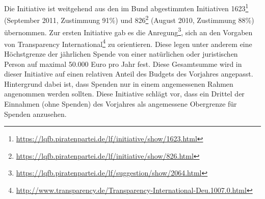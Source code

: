 Die Initiative ist weitgehend aus den im Bund abgestimmten Initiativen 1623\footnote{\url{https://lqfb.piratenpartei.de/lf/initiative/show/1623.html}} (September 2011, Zustimmung 91\%) und 826\footnote{\url{https://lqfb.piratenpartei.de/lf/initiative/show/826.html}} (August 2010, Zustimmung 88\%) übernommen. Zur ersten Initiative gab es die Anregung\footnote{\url{https://lqfb.piratenpartei.de/lf/suggestion/show/2064.html}}, sich an den Vorgaben von Transparency International\footnote{\url{http://www.transparency.de/Transparency-International-Deu.1007.0.html}} zu orientieren. Diese legen unter anderem eine Höchstgrenze der jährlichen Spende von einer natürlichen oder juristischen Person auf maximal 50.000 Euro pro Jahr fest. Diese Gesamtsumme wird in dieser Initiative auf einen relativen Anteil des Budgets des Vorjahres angepasst. Hintergrund dabei ist, dass Spenden nur in einem angemessenen Rahmen angenommen werden sollten. Diese Initiative schlägt vor, dass ein Drittel der Einnahmen (ohne Spenden) des Vorjahres als angemessene Obergrenze für Spenden anzusehen.
